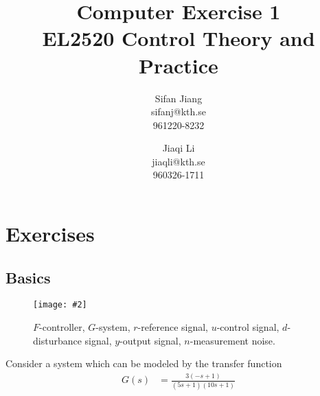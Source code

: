 \documentclass[11pt,a4paper]{article}
\title{
	Computer Exercise 1\\
	EL2520 Control Theory and Practice
}
\author{
	Sifan Jiang\\
	sifanj@kth.se\\
	961220-8232
	\and
	Jiaqi Li\\
	jiaqli@kth.se\\
	960326-1711
}
\newcommand{\image}[3]{
	\begin{figure}[!ht]
		\centering
	    \texttt{[image: \#2]}
		\caption{#3}
		\label{fig:#2}
	\end{figure}
}
\begin{document}
\maketitle

\section{Exercises}
\subsection{Basics}
\image{0.75}{system}{$F$-controller, $G$-system, $r$-reference signal, $u$-control signal, $d$-disturbance signal, $y$-output signal, $n$-measurement noise.}

\par Consider a system which can be modeled by the transfer function
\begin{align*}
	G(s) &= \frac{3(-s+1)}{(5s+1)(10s+1)}
\end{align*}
\end{document}
